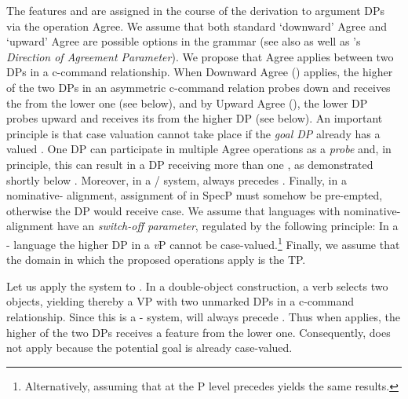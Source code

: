 \documentclass[output=paper,modfonts,newtxmath,hidelinks]{langscibook}
\begin{document}
\noindent The features \hr{} and \lr{} are assigned in the course of the derivation to argument DPs via the operation Agree. We assume that both standard `downward' Agree and `upward' Agree \citep[see][]{chomsky86,chomsky91,kayne89,pollock89,koopman06} are possible options in the grammar (see also \citealt[92f.]{abels-phases} as well as \citeauthor{baker-agrbook}'s \citeyear[155]{baker-agrbook} \textit{Direction of Agreement Parameter}). We propose that Agree applies between two DPs in a c-command relationship. When Downward Agree (\down) applies, the higher of the two DPs in an asymmetric c-command relation probes down and receives the \lr{} from the lower one (see  below), and by Upward Agree (\up), the lower DP probes upward and receives its \hr{}  from the higher DP (see  below). An important principle is that case valuation cannot take place if the \textit{goal DP} already has a valued  \citep{bittnerhale96,baker15}. One DP can participate in multiple Agree operations as a \textit{probe} and, in principle, this can result in a DP receiving more than one , as demonstrated shortly below . Moreover, in a \nomm/\accc{} system, \down{} always precedes \up. Finally, in a nominative- alignment, assignment of \lr{} in Spec\littlev{}P must somehow be pre-empted, otherwise the DP would receive  case. We assume that languages with nominative-{\linebreak} alignment have an \textit{ switch-off parameter}, regulated by the following principle: In a \nomm-\accc{} language the higher DP in a \textit{v}P cannot be case-valued.\footnote{Alternatively, assuming that at the \littlev{}P level \up{} precedes \down{} yields the same results.} Finally, we assume that the domain in which the proposed operations apply is the TP. 

\newpage 
Let us apply the system to  . In a double-object construction, a verb selects two objects, yielding thereby a VP with two unmarked DPs in a c-command relationship. Since this is a \nomm{}-\accc{} system, \down{} will always precede \up{}. Thus when \down{} applies, the higher of the two DPs receives a \lr{} feature from the lower one. Consequently, \up{} does not apply because the potential goal is already case-valued.  
\end{document}
